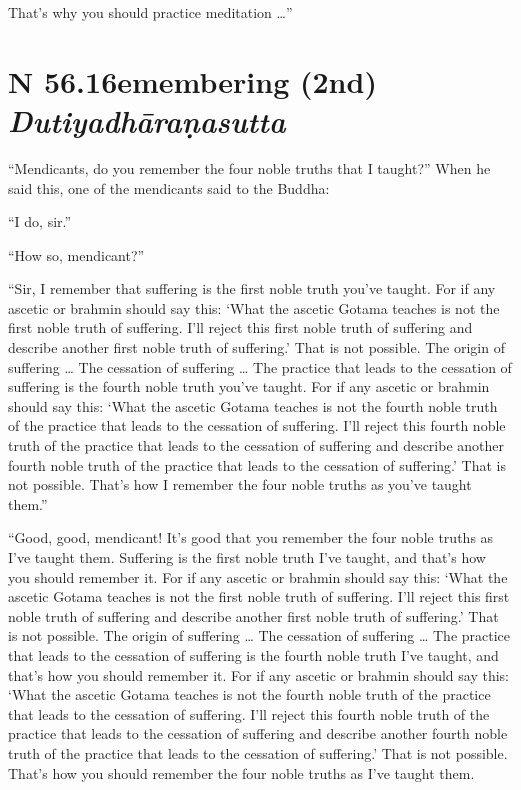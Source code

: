 \documentclass[12pt,openany]{book}%
\newcommand*{\suttatitleacronym}[1]{\smaller[2]{#1}\vspace*{.3em}}
\newcommand*{\suttatitletranslation}[1]{\linebreak{#1}}
\newcommand*{\suttatitleroot}[1]{\linebreak\smaller[2]\itshape{#1}}
\newcommand*{\tocacronym}[1]{\hspace*{-3.3em}{#1}\quad}
\newcommand*{\toctranslation}[1]{#1}
\newcommand*{\tocroot}[1]{(\textit{#1})}
\begin{document}
That’s why you should practice meditation …” 

%
\section*{{\suttatitleacronym SN 56.16}{\suttatitletranslation Remembering (2nd) }{\suttatitleroot Dutiyadhāraṇasutta}}
\addcontentsline{toc}{section}{\tocacronym{SN 56.16} \toctranslation{Remembering (2nd) } \tocroot{Dutiyadhāraṇasutta}}

“Mendicants, do you remember the four noble truths that I taught?” When he said this, one of the mendicants said to the Buddha: 

“I do, sir.” 

“How so, mendicant?” 

“Sir, I remember that suffering is the first noble truth you’ve taught. For if any ascetic or brahmin should say this: ‘What the ascetic Gotama teaches is not the first noble truth of suffering. I’ll reject this first noble truth of suffering and describe another first noble truth of suffering.’ That is not possible. The origin of suffering … The cessation of suffering … The practice that leads to the cessation of suffering is the fourth noble truth you’ve taught. For if any ascetic or brahmin should say this: ‘What the ascetic Gotama teaches is not the fourth noble truth of the practice that leads to the cessation of suffering. I’ll reject this fourth noble truth of the practice that leads to the cessation of suffering and describe another fourth noble truth of the practice that leads to the cessation of suffering.’ That is not possible. That’s how I remember the four noble truths as you’ve taught them.” 

“Good, good, mendicant! It’s good that you remember the four noble truths as I’ve taught them. Suffering is the first noble truth I’ve taught, and that’s how you should remember it. For if any ascetic or brahmin should say this: ‘What the ascetic Gotama teaches is not the first noble truth of suffering. I’ll reject this first noble truth of suffering and describe another first noble truth of suffering.’ That is not possible. The origin of suffering … The cessation of suffering … The practice that leads to the cessation of suffering is the fourth noble truth I’ve taught, and that’s how you should remember it. For if any ascetic or brahmin should say this: ‘What the ascetic Gotama teaches is not the fourth noble truth of the practice that leads to the cessation of suffering. I’ll reject this fourth noble truth of the practice that leads to the cessation of suffering and describe another fourth noble truth of the practice that leads to the cessation of suffering.’ That is not possible. That’s how you should remember the four noble truths as I’ve taught them. 
\end{document}
